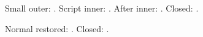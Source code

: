 \documentclass{article}
\makeatletter
\newcommand{\IndentValue}{\the\ALG@tlm}
\makeatother
\begin{document}
\begingroup
\small
\begin{algorithmic}[1]
  \State Small outer: \IndentValue.
  \scriptsize
    \State Script inner: \IndentValue.
  \EndIf
  \State After inner: \IndentValue.
\EndIf
\State Closed: \IndentValue.
\end{algorithmic}
\endgroup
\begin{algorithmic}[1]
  \State Normal restored: \IndentValue.
\EndIf
\State Closed: \IndentValue.
\end{algorithmic}
\end{document}

